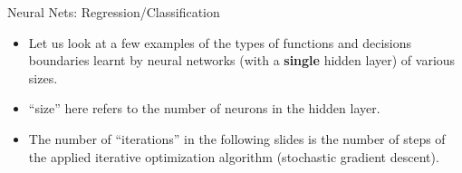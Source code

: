\begin{frame} {Neural Nets: Regression/Classification}
  \begin{itemize}
    \vspace{15mm}
    \item Let us look at a few examples of the types of functions and decisions boundaries learnt by neural networks (with a \textbf{single} hidden layer) of various sizes.
       \vspace{5mm} 
    \item \enquote{size} here refers to the number of neurons in the hidden layer.
    \vspace{5mm}
    \item The number of  \enquote{iterations} in the following slides is the number of steps of the applied iterative optimization algorithm (stochastic gradient descent).
  \end{itemize}
\end{frame}

